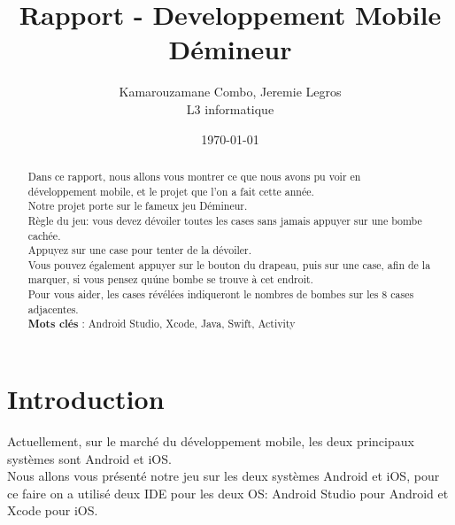 \documentclass{article}
\title{\textbf{ Rapport - Developpement Mobile \\ Démineur}}
\author{Kamarouzamane Combo, Jeremie Legros\\
		L3 informatique\\
	  }
\date{\today}
\begin{document}
\maketitle %


\begin{abstract}
	Dans ce rapport, nous allons vous montrer ce que nous avons pu voir en développement mobile, et le projet que l'on a fait cette année.\\ 

	Notre projet porte sur le fameux jeu Démineur.\\
Règle du jeu: vous devez dévoiler toutes les cases sans jamais appuyer sur une bombe cachée.\\ Appuyez sur une case pour tenter de la dévoiler.\\ Vous pouvez également appuyer sur le bouton du drapeau, puis sur une case, afin de la marquer, si vous pensez qu\'une bombe se trouve à cet endroit.\\ Pour vous aider, les cases révélées indiqueront le nombres de bombes sur les 8 cases adjacentes.\\

	\textbf{Mots clés }: Android Studio, Xcode, Java, Swift, Activity
\end{abstract}


\section{Introduction}
\label{section:intro} %

	Actuellement, sur le marché du développement mobile, les deux principaux systèmes sont Android et iOS.~\cite{statOS}\\ Nous allons vous présenté notre jeu sur les deux systèmes Android et iOS, pour ce faire on a utilisé deux IDE pour les deux OS: Android Studio pour Android et Xcode pour iOS.   
\end{document}
